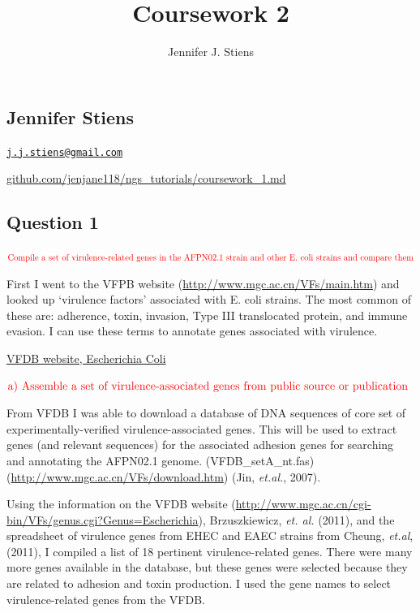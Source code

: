 \documentclass[]{article}
\title{Coursework 2}
\author{Jennifer J. Stiens}
\date{}
\begin{document}
\maketitle

\subsection{Jennifer Stiens}\label{jennifer-stiens}

\href{mailto:j.j.stiens@gmail.com}{\nolinkurl{j.j.stiens@gmail.com}}

\href{https://github.com/jenjane118/ngs_tutorials}{github.com/jenjane118/ngs\_tutorials/coursework\_1.md}

\subsection{Question 1}\label{question-1}

\(\color{red}{\text{Compile a set of virulence-related genes in the AFPN02.1 strain and other E. coli strains and compare them}}\)

First I went to the VFPB website
(\url{http://www.mgc.ac.cn/VFs/main.htm}) and looked up `virulence
factors' associated with E. coli strains. The most common of these are:
adherence, toxin, invasion, Type III translocated protein, and immune
evasion. I can use these terms to annotate genes associated with
virulence.

\href{http://www.mgc.ac.cn/cgi-bin/VFs/genus.cgi?Genus=Escherichia}{VFDB
website, Escherichia Coli}

\(\color{red}{\text{a) Assemble a set of virulence-associated genes from public source or publication}}\)

From VFDB I was able to download a database of DNA sequences of core set
of experimentally-verified virulence-associated genes. This will be used
to extract genes (and relevant sequences) for the associated adhesion
genes for searching and annotating the AFPN02.1 genome.
(VFDB\_setA\_nt.fas) (\url{http://www.mgc.ac.cn/VFs/download.htm}) (Jin,
\emph{et.al.}, 2007).

Using the information on the VFDB website
(\url{http://www.mgc.ac.cn/cgi-bin/VFs/genus.cgi?Genus=Escherichia}),
Brzuszkiewicz, \emph{et. al.} (2011), and the spreadsheet of virulence
genes from EHEC and EAEC strains from Cheung, \emph{et.al}, (2011), I
compiled a list of 18 pertinent virulence-related genes. There were many
more genes available in the database, but these genes were selected
because they are related to adhesion and toxin production. I used the
gene names to select virulence-related genes from the VFDB.
\end{document}
